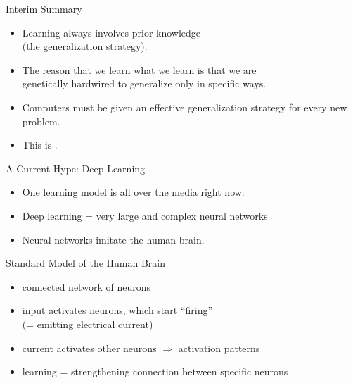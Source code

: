\documentclass[xcolor={usenames,svgnames,x11names,dvipsnames,table}]{beamer}
\begin{document}
\begin{frame}{Interim Summary}
    \begin{itemize}
        \item Learning always involves prior knowledge\\
            (the generalization strategy).
        \item The reason that we learn what we learn is that we are\\
            genetically hardwired to generalize only in specific ways.
        \item Computers must be given an effective generalization strategy for every new problem.
        \item This is .
    \end{itemize}

\end{frame}

\begin{frame}{A Current Hype: Deep Learning}
    \begin{itemize}
        \item One learning model is all over the media right now:\\
        \item Deep learning = very large and complex neural networks
        \item Neural networks imitate the human brain.
    \end{itemize}

    \pause
    \begin{block}{Standard Model of the Human Brain}
        \begin{itemize}
            \item connected network of neurons
            \item input activates neurons, which start ``firing''\\
                (= emitting electrical current)
            \item current activates other neurons $\Rightarrow$ activation patterns
            \item learning = strengthening connection between specific neurons
        \end{itemize}
    \end{block}
\end{frame}
\end{document}
